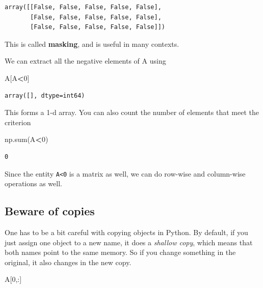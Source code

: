 \documentclass[
  letterpaper,
]{scrbook}
\newenvironment{Shaded}{\begin{snugshade}}{\end{snugshade}}
\newcommand{\BuiltInTok}[1]{#1}
\newcommand{\DecValTok}[1]{\textcolor[rgb]{0.00,0.00,0.81}{#1}}
\newcommand{\NormalTok}[1]{#1}
\newcommand{\OperatorTok}[1]{\textcolor[rgb]{0.81,0.36,0.00}{\textbf{#1}}}
\begin{document}
\begin{verbatim}
array([[False, False, False, False, False],
       [False, False, False, False, False],
       [False, False, False, False, False]])
\end{verbatim}

This is called \textbf{masking}, and is useful in many contexts.

We can extract all the negative elements of A using

\begin{Shaded}
\begin{Highlighting}[]
\NormalTok{A[A}\OperatorTok{<}\DecValTok{0}\NormalTok{]}
\end{Highlighting}
\end{Shaded}

\begin{verbatim}
array([], dtype=int64)
\end{verbatim}

This forms a 1-d array. You can also count the number of elements that meet the criterion

\begin{Shaded}
\begin{Highlighting}[]
\NormalTok{np.}\BuiltInTok{sum}\NormalTok{(A}\OperatorTok{<}\DecValTok{0}\NormalTok{)}
\end{Highlighting}
\end{Shaded}

\begin{verbatim}
0
\end{verbatim}

Since the entity \texttt{A\textless{}0} is a matrix as well, we can do row-wise and column-wise operations as well.

\hypertarget{beware-of-copies}{%
\subsection{Beware of copies}\label{beware-of-copies}}

One has to be a bit careful with copying objects in Python. By default, if you just assign one object to a new name, it does a \emph{shallow copy}, which means that both names point to the same memory. So if you change something in the original, it also changes in the new copy.

\begin{Shaded}
\begin{Highlighting}[]
\NormalTok{A[}\DecValTok{0}\NormalTok{,:]}
\end{Highlighting}
\end{Shaded}
\end{document}
